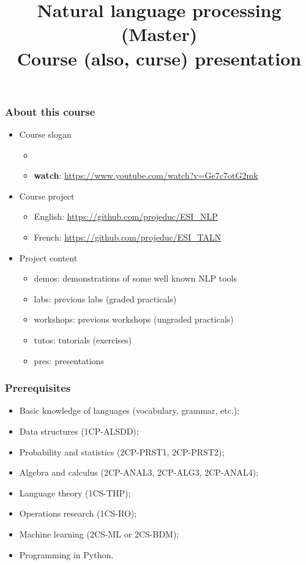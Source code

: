 \documentclass{beamer}
\title[ESI - NLP\_master: Presentation] %
{Natural language processing (Master)\\Course (also, curse) presentation}
\begin{document}
 
 
 \begin{frame}
 	\frametitle{About this course}
 	
 	\begin{itemize}
 		\item Course slogan
 		\begin{itemize}
 			\item {}
 			\item \textbf{watch}: \url{https://www.youtube.com/watch?v=Ge7c7otG2mk}
 		\end{itemize}
 		\item Course project
 		\begin{itemize}
 			\item English: \url{https://github.com/projeduc/ESI_NLP}
 			\item French: \url{https://github.com/projeduc/ESI_TALN}
 		\end{itemize}
 		\item Project content
 		\begin{itemize}
 			\item demos: demonstrations of some well known NLP tools 
 			\item labs: previous labs (graded practicals)
 			\item workshops: previous workshops (ungraded practicals)
 			\item tutos: tutorials (exercises) 
 			\item pres: presentations
 		\end{itemize}
 	\end{itemize}
 	
 \end{frame}

\begin{frame}
\frametitle{Prerequisites}

\begin{itemize}
	\item Basic knowledge of languages (vocabulary, grammar, etc.);
	\item Data structures (1CP-ALSDD);
	\item Probability and statistics (2CP-PRST1, 2CP-PRST2);
	\item Algebra and calculus (2CP-ANAL3, 2CP-ALG3, 2CP-ANAL4);
	\item Language theory (1CS-THP);
	\item Operations research (1CS-RO);
	\item Machine learning (2CS-ML or 2CS-BDM);
	\item Programming in Python.
\end{itemize}

\end{frame}
\end{document}
